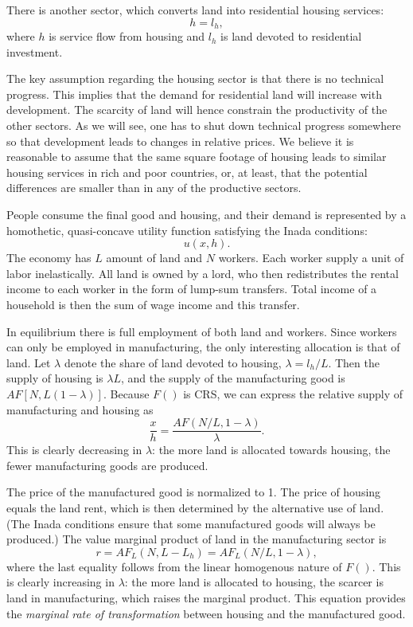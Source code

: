 \documentclass[12pt]{article}
\begin{document}
There is another sector, which converts land into residential housing services:
\[
h = l_h,
\]
where $h$ is service flow from housing and $l_h$ is land devoted to residential investment.

The key assumption regarding the housing sector is that there is no technical progress. This implies that the demand for residential land will increase with development. The scarcity of land will hence constrain the productivity of the other sectors. As we will see, one has to shut down technical progress somewhere so that development leads to changes in relative prices. We believe it is reasonable to assume that the same square footage of housing leads to similar housing services in rich and poor countries, or, at least, that the potential differences are smaller than in any of the productive sectors.

People consume the final good and housing, and their demand is represented by a homothetic, quasi-concave utility function satisfying the Inada conditions:
\[
u(x,h).
\]
The economy has $L$ amount of land and $N$ workers. Each worker supply a unit of labor inelastically. All land is owned by a lord, who then redistributes the rental income to each worker in the form of lump-sum transfers. Total income of a household is then the sum of wage income and this transfer.

In equilibrium there is full employment of both land and workers. Since workers can only be employed in manufacturing, the only interesting allocation is that of land. Let ${\lambda}$ denote the share of land devoted to housing, ${\lambda} = l_h/L$. Then the supply of housing is ${\lambda} L$, and the supply of the manufacturing good is $AF[N,L(1-{\lambda})]$. Because $F()$ is CRS, we can express the relative supply of manufacturing and housing as
\[
\frac{x}{h} = \frac{AF(N/L,1-{\lambda})}{{\lambda}}.
\]
This is clearly decreasing in ${\lambda}$: the more land is allocated towards housing, the fewer manufacturing goods are produced.

The price of the manufactured good is normalized to 1. The price of housing equals the land rent, which is then determined by the alternative use of land. (The Inada conditions ensure that some manufactured goods will always be produced.) The value marginal product of land in the manufacturing sector is
\begin{equation}\label{eq:MRT}
r = AF_L(N,L-L_h) = AF_L(N/L,1-{\lambda}),
\end{equation}
where the last equality follows from the linear homogenous nature of $F()$. This is clearly increasing in ${\lambda}$: the more land is allocated to housing, the scarcer is land in manufacturing, which raises the marginal product. This equation provides the \emph{marginal rate of transformation} between housing and the manufactured good.
\end{document}
